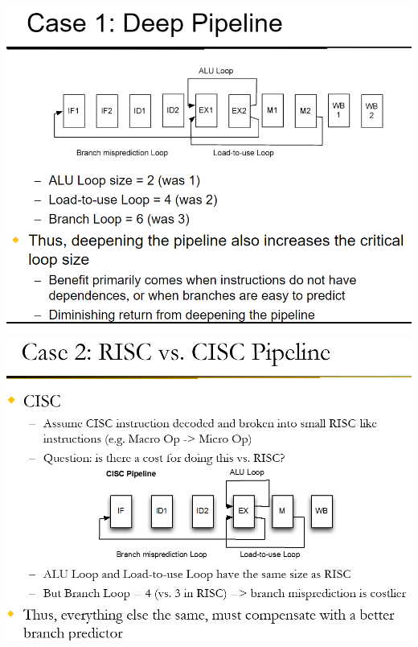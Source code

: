 \documentclass[12pt]{extarticle}
\begin{document}
	\begin{center}
		\includegraphics[scale=0.5]{assets/loop-analysis-ex2.png}
	\end{center}

	\begin{center}
		\includegraphics[scale=0.5]{assets/loop-analysis-ex3.png}
	\end{center}
\end{document}
